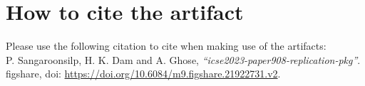 \documentclass{article}
\begin{document}
\section{How to cite the artifact}

Please use the following citation to cite when making use of the artifacts: \\

\noindent P. Sangaroonsilp, H. K. Dam and A. Ghose, \textit{“icse2023-paper908-replication-pkg”}. figshare, doi: \url{https://doi.org/10.6084/m9.figshare.21922731.v2}. 
\end{document}
